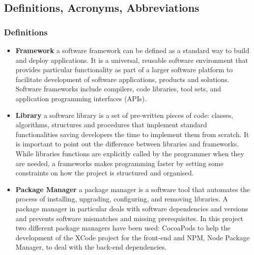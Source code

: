 \documentclass[titlepage]{article}
\begin{document}
	\subsection{Definitions, Acronyms, Abbreviations}
	\subsubsection{Definitions}
	\begin{itemize}
		\item {\bf Framework}
		a software framework can be defined as a standard way to build and deploy applications. It is a universal, reusable software environment that provides particular functionality as part of a larger software platform to facilitate development of software applications, products and solutions. Software frameworks include compilers, code libraries, tool sets, and application programming interfaces (APIs).
		
		\item {\bf Library}
		a software library is a set of pre-written pieces of code: classes, algorithms, structures and procedures that implement standard functionalities saving developers the time to implement them from scratch. It is important to point out the difference between libraries and frameworks. While libraries\textsc{} functions are explicitly called by the programmer when they are needed, a frameworks makes programming faster by setting some constraints on how the project is structured and organised.
		
		\item {\bf Package Manager}
		a package manager is a software tool that automates the process of installing, upgrading, configuring, and removing libraries. A package manager in particular deals with software dependencies and versions and prevents software mismatches and missing prerequisites. In this project two different package managers have been used: CocoaPods to help the development of the XCode project for the front-end and NPM, Node Package Manager, to deal with the back-end dependencies.
	\end{itemize}
\end{document}
